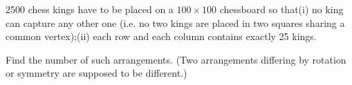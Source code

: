 2500 chess kings have to be placed on a $100 \times 100$ chessboard so that(i) no king can capture any other one (i.e. no two kings are placed in two squares sharing a common vertex);(ii) each row and each column contains exactly 25 kings.

Find the number of such arrangements. (Two arrangements differing by rotation or symmetry are supposed to be different.)
